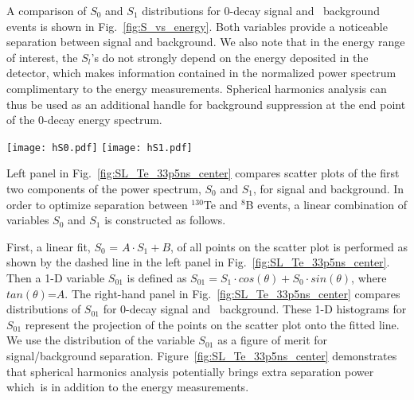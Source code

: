 A comparison of $S_0$ and $S_1$ distributions for 0\nbb-decay signal and \B~background events is shown in Fig.~\ref{fig:S_vs_energy}.
Both variables provide a noticeable separation between signal and background. We also note that in the energy range of interest, 
the $S_l$'s do not strongly depend on the energy deposited in the detector, which makes information contained in the normalized power 
spectrum complimentary to the energy measurements. Spherical harmonics analysis can thus be used as an additional handle for
background suppression at the end point of the 0\nbb-decay energy spectrum.

\begin{figure*}[h]
\centering
\texttt{[image: hS0.pdf]}
\texttt{[image: hS1.pdf]}
\caption{$S_0$ (\emph{left}) and $S_1$ (\emph{right}) distributions for 1000 simulated 0\nbb-decay signal and \B~background events.
  Two different isotopes are compared, $^{130}$Te and $^{82}$Se. Corresponding kinetic energies of \B~single electrons are
  2.53 MeV and 3.00 MeV. Central events assuming perfect reconstruction of vertex position. Time cut of 33.5~ns on the PE arrival time is
  applied. The default QE and 100\% photo-coverage is used in the simulation.}
\label{fig:S_vs_energy}
\end{figure*}

Left panel in Fig.~\ref{fig:SL_Te_33p5ns_center} compares scatter plots of the first two components of the power spectrum, 
$S_0$ and $S_1$, for signal and background. In order to optimize separation between $^{130}$Te and $^{8}$B
events, a linear combination of variables $S_0$ and $S_1$ is constructed as follows. 

First, a linear fit, $S_0$ = $A \cdot S_1 + B$, of all points on the scatter plot is performed as shown by the dashed 
line in the left panel in Fig.~\ref{fig:SL_Te_33p5ns_center}. Then a 1-D variable $S_{01}$ is defined as
$S_{01} = S_1 \cdot cos(\theta) + S_0 \cdot sin(\theta)$, where $tan(\theta)$=$A$. The right-hand panel in Fig.~\ref{fig:SL_Te_33p5ns_center}
compares distributions of $S_{01}$ for 0\nbb-decay signal and \B~background. These 1-D histograms for $S_{01}$ represent the
projection of the points on the scatter plot onto the fitted line. We use the distribution of the variable $S_{01}$ as a figure of merit
for signal/background separation. Figure~\ref{fig:SL_Te_33p5ns_center} demonstrates that spherical harmonics analysis potentially 
brings extra separation power which\ is in addition to the energy measurements.


